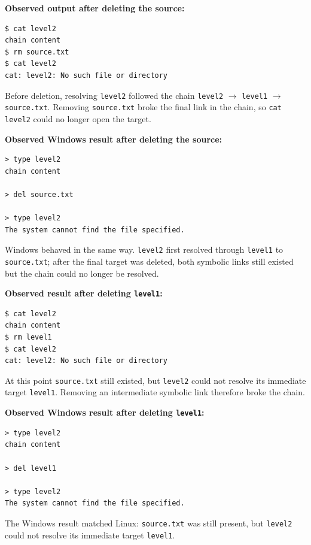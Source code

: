 \documentclass[a4paper,11pt]{article}
\begin{document}
\noindent\textbf{Observed output after deleting the source:}
\begin{lstlisting}
$ cat level2
chain content
$ rm source.txt
$ cat level2
cat: level2: No such file or directory
\end{lstlisting}

Before deletion, resolving \texttt{level2} followed the chain
\texttt{level2} $\to$ \texttt{level1} $\to$ \texttt{source.txt}. Removing
\texttt{source.txt} broke the final link in the chain, so \texttt{cat level2}
could no longer open the target.

\noindent\textbf{Observed Windows result after deleting the source:}
\begin{lstlisting}
> type level2
chain content

> del source.txt

> type level2
The system cannot find the file specified.
\end{lstlisting}

Windows behaved in the same way. \texttt{level2} first resolved through
\texttt{level1} to \texttt{source.txt}; after the final target was deleted,
both symbolic links still existed but the chain could no longer be resolved.

\noindent\textbf{Observed result after deleting \texttt{level1}:}
\begin{lstlisting}
$ cat level2
chain content
$ rm level1
$ cat level2
cat: level2: No such file or directory
\end{lstlisting}

At this point \texttt{source.txt} still existed, but \texttt{level2} could not
resolve its immediate target \texttt{level1}. Removing an intermediate
symbolic link therefore broke the chain.

\noindent\textbf{Observed Windows result after deleting \texttt{level1}:}
\begin{lstlisting}
> type level2
chain content

> del level1

> type level2
The system cannot find the file specified.
\end{lstlisting}

The Windows result matched Linux: \texttt{source.txt} was still present, but
\texttt{level2} could not resolve its immediate target \texttt{level1}.
\end{document}
